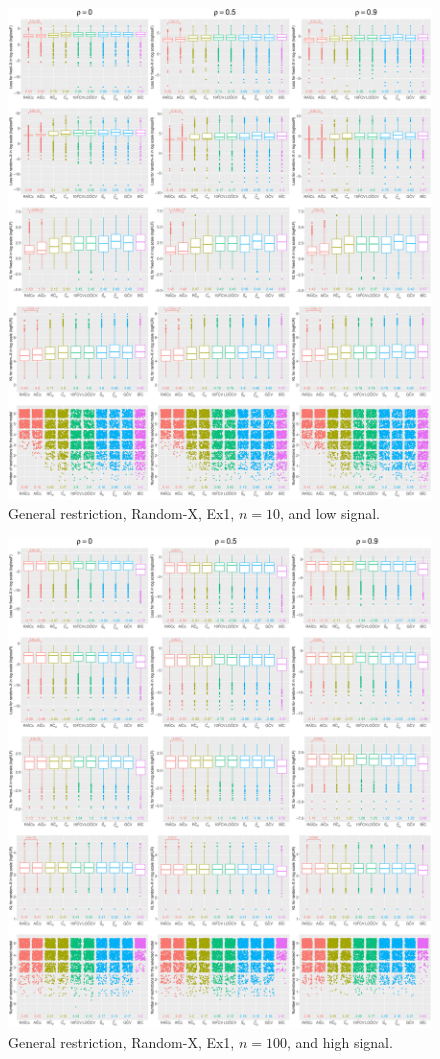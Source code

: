 \begin{figure}[!ht]
\centering
\includegraphics[width=\textwidth]{figures/supplement/randomx/general_restriction/Ex1_n10_lsnr.eps}
\caption{General restriction, Random-X, Ex1, $n=10$, and low signal.}
\end{figure}
\clearpage
\begin{figure}[!ht]
\centering
\includegraphics[width=\textwidth]{figures/supplement/randomx/general_restriction/Ex1_n100_hsnr.eps}
\caption{General restriction, Random-X, Ex1, $n=100$, and high signal.}
\end{figure}
